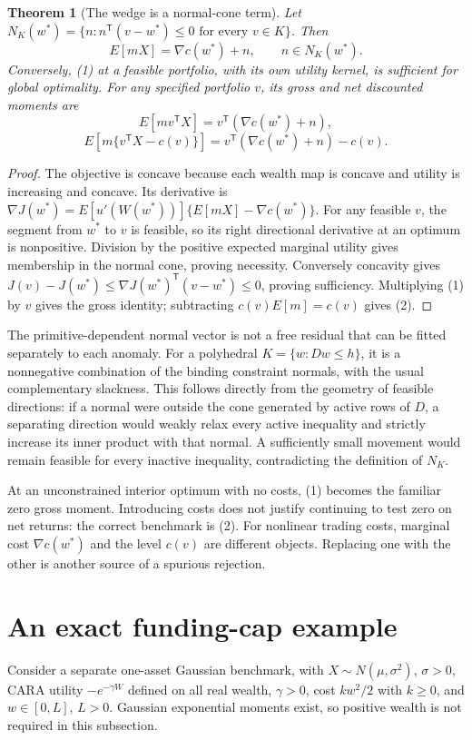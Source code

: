 \documentclass[11pt]{article}
\newtheorem{theorem}{Theorem}
\theoremstyle{definition}
\begin{document}
\begin{theorem}[The wedge is a normal-cone term]
Let $N_K(w^*)=\{n:n^{\mathsf T}(v-w^*)\le0\text{ for every }v\in K\}$. Then
\[
 E[mX]=\nabla c(w^*)+n,\qquad n\in N_K(w^*).
 \tag{1}
\]
Conversely, (1) at a feasible portfolio, with its own utility kernel, is sufficient for global optimality. For any specified portfolio $v$, its gross and net discounted moments are
\[
 E[mv^{\mathsf T}X]=v^{\mathsf T}(\nabla c(w^*)+n),
\]
\[
 E[m\{v^{\mathsf T}X-c(v)\}]
   =v^{\mathsf T}(\nabla c(w^*)+n)-c(v).
 \tag{2}
\]
\end{theorem}
\begin{proof}
The objective is concave because each wealth map is concave and utility is increasing and concave. Its derivative is
$\nabla J(w^*)=E[u'(W(w^*))]\{E[mX]-\nabla c(w^*)\}$.
For any feasible $v$, the segment from $w^*$ to $v$ is feasible, so its right directional derivative at an optimum is nonpositive. Division by the positive expected marginal utility gives membership in the normal cone, proving necessity. Conversely concavity gives
$J(v)-J(w^*)\le\nabla J(w^*)^{\mathsf T}(v-w^*)\le0$, proving sufficiency. Multiplying (1) by $v$ gives the gross identity; subtracting $c(v)E[m]=c(v)$ gives (2).
\end{proof}
The primitive-dependent normal vector is not a free residual that can be fitted separately to each anomaly. For a polyhedral $K=\{w:Dw\le h\}$, it is a nonnegative combination of the binding constraint normals, with the usual complementary slackness. This follows directly from the geometry of feasible directions: if a normal were outside the cone generated by active rows of $D$, a separating direction would weakly relax every active inequality and strictly increase its inner product with that normal. A sufficiently small movement would remain feasible for every inactive inequality, contradicting the definition of $N_K$.

At an unconstrained interior optimum with no costs, (1) becomes the familiar zero gross moment. Introducing costs does not justify continuing to test zero on net returns: the correct benchmark is (2). For nonlinear trading costs, marginal cost $\nabla c(w^*)$ and the level $c(v)$ are different objects. Replacing one with the other is another source of a spurious rejection.

\section*{An exact funding-cap example}
Consider a separate one-asset Gaussian benchmark, with $X\sim N(\mu,\sigma^2)$, $\sigma>0$, CARA utility $-e^{-\gamma W}$ defined on all real wealth, $\gamma>0$, cost $kw^2/2$ with $k\ge0$, and $w\in[0,L]$, $L>0$. Gaussian exponential moments exist, so positive wealth is not required in this subsection.
\end{document}
